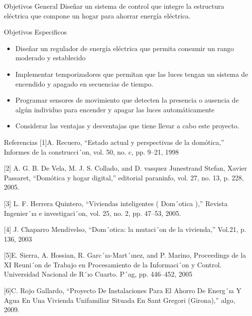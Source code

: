 \documentclass{beamer}
\begin{document}
\begin{frame}[fragile]
\vspace{0.2em}
\begin{block}{Objetivos General}
Diseñar un sistema de control que integre la estructura eléctrica que compone un hogar para ahorrar energía eléctrica.
\end{block}


\vspace{0.1em}
\begin{block}{Objetivos Especificos}
\begin{itemize}

\item Diseñar un regulador de energía eléctrica que permita consumir un rango moderado y establecido
\item Implementar temporizadores que permitan que las luces tengan un sistema de encendido y apagado en secuencias de tiempo.
\item Programar sensores de movimiento que detecten la presencia o ausencia de algún individuo para encender y apagar las luces automáticamente
\item Considerar las ventajas y desventajas que tiene llevar a cabo este proyecto.
\end{itemize}
\end{block}


\vspace{.2em}
\begin{block}{Referencias}
[1]A. Recuero, “Estado actual y perspectivas de la domótica,” Informes de la construcci´on, vol. 50, no. c, pp. 9–21, 1998 

[2] A. G. B. De Vela, M. J. S. Collado, and D. vasquez Junestrand Stefan, Xavier Passaret, “Domótica y hogar digital,” editorial paraninfo, vol. 27, no. 13, p. 228, 2005.

[3] L. F. Herrera Quintero, “Viviendas inteligentes ( Dom´otica ),” Revista Ingenier´ıa e investigaci´on, vol. 25, no. 2, pp. 47–53, 2005.

[4] J. Chaparro Mendivelso, “Dom´otica: la mutaci´on de la vivienda,” Vol.21, p. 136, 2003

[5]E. Sierra, A. Hossian, R. Garc´ıa-Mart´ınez, and P. Marino, Proceedings de la XI Reuni´on de Trabajo en Procesamiento de la Informaci´on y Control. Universidad Nacional de R´ıo Cuarto. P´ag, pp. 446–452, 2005

[6]C. Rojo Gallardo, “Proyecto De Instalaciones Para El Ahorro De Energ´ıa Y Agua En Una Vivienda Unifamiliar Situada En Sant Gregori (Girona),” algo, 2009.


\end{block}




\end{frame}
\end{document}
